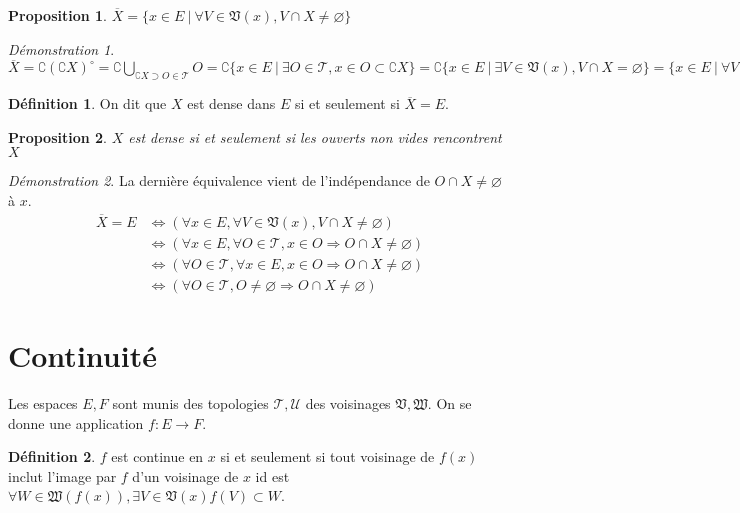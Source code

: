 \documentclass[a4paper, 11pt, french]{book}
\theoremstyle{plain} %
\newtheorem{proposition}{Proposition}
\theoremstyle{definition} %
\newtheorem{definition}{Définition}
\theoremstyle{remark} %
\newtheorem*{demonstration}{Démonstration}
\newcommand{\1}{\mathds{1}}
\newcommand\vide{\varnothing}
\newcommand\ens[2]{\{#1 \ |\ #2\}}
\begin{document}
\begin{proposition}
	$\overline{X}=\ens{x\in E}{\forall V\in\mathfrak{V}(x), V\cap X\neq\vide}$
\end{proposition}

\begin{demonstration}
	$\overline{X}
		=\complement(\complement X)^\circ
		=\complement\bigcup_{\complement X\supset O\in\mathscr{T}}O
		=\complement\ens{x\in E}{\exists O\in\mathscr{T}, x\in O\subset\complement X}
		=\complement\ens{x\in E}{\exists V\in\mathfrak{V}(x), V\cap X=\vide}
		=\ens{x\in E}{\forall V\in\mathfrak{V}(x), V\cap X\neq\vide}$
\end{demonstration}

\begin{definition}
	On dit que $X$ est dense dans $E$ si et seulement si $\overline{X}=E$.
\end{definition}

\begin{proposition}
	$X$ est dense si et seulement si les ouverts non vides rencontrent $X$
\end{proposition}

\begin{demonstration}
	La dernière équivalence vient de l'indépendance de $O\cap X\neq\vide$ à $x$.
	$$
		\begin{aligned}
			\overline{X}=E
				&\Leftrightarrow(\forall x\in E, \forall V\in\mathfrak{V}(x), V\cap X\neq\vide)\\
				&\Leftrightarrow(\forall x\in E, \forall O\in\mathscr{T}, x\in O\Rightarrow O\cap X\neq\vide)\\
				&\Leftrightarrow(\forall O\in\mathscr{T}, \forall x\in E, x\in O\Rightarrow O\cap X\neq\vide)\\
				&\Leftrightarrow(\forall O\in\mathscr{T}, O\neq\vide\Rightarrow O\cap X\neq\vide)
		\end{aligned}
	$$
\end{demonstration}


\section{Continuité}

Les espaces $E, F$ sont munis des topologies $\mathscr{T}, \mathscr{U}$ des voisinages $\mathfrak{V}, \mathfrak{W}$.
On se donne une application $f\colon E\rightarrow F$.

\begin{definition}
	$f$ est continue en $x$ si et seulement si tout voisinage de $f(x)$ inclut l'image par $f$ d'un voisinage de $x$ id est $\forall W\in\mathfrak{W}(f(x)), \exists V\in\mathfrak{V}(x) f(V)\subset W$.
\end{definition}
\end{document}
